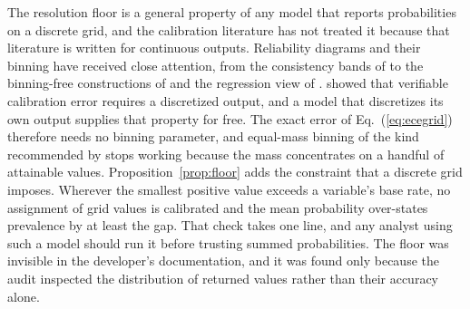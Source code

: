 The resolution floor is a general property of any model that reports probabilities on a
discrete grid, and the calibration literature has not treated it because that literature is
written for continuous outputs. Reliability diagrams and their binning have received close
attention, from the consistency bands of \citet{brocker2007diagrams} to the binning-free
constructions of \citet{dimitriadis2021stable} and the regression view of
\citet{gneiting2023regression}. \citet{kumar2019verified} showed that verifiable calibration
error requires a discretized output, and a model that discretizes its own output supplies that
property for free. The exact error of Eq.~(\ref{eq:ecegrid}) therefore needs no binning
parameter, and equal-mass binning of the kind recommended by \citet{nixon2019measuring} stops
working because the mass concentrates on a handful of attainable values.
Proposition~\ref{prop:floor} adds the constraint that a discrete grid imposes. Wherever the
smallest positive value exceeds a variable's base rate, no assignment of grid values is
calibrated and the mean probability over-states prevalence by at least the gap. That check
takes one line, and any analyst using such a model should run it before trusting summed
probabilities. The floor was invisible in the developer's documentation, and it was found only
because the audit inspected the distribution of returned values rather than their accuracy
alone.

